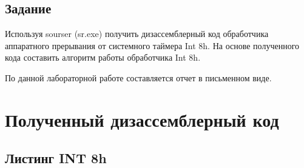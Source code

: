 \documentclass[14pt, a4paper]{article}
\begin{document}
	\subsection*{Задание}
	
	Используя sourser (sr.exe) получить дизассемблерный код обработчика аппаратного прерывания от системного таймера Int 8h.
	На основе полученного кода составить алгоритм работы обработчика Int 8h.
	
	По данной лабораторной работе составляется отчет в письменном виде.
	
	\pagebreak
	
	\section*{Полученный дизассемблерный код}
	
	\subsection*{Листинг INT 8h}
	
\end{document}
